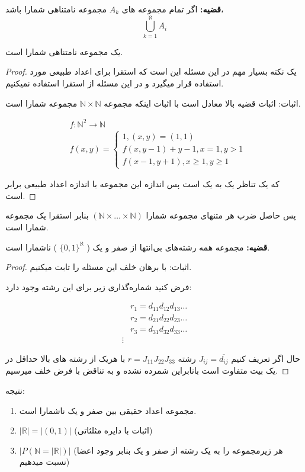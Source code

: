 \textbf{قضیه:}
اگر تمام مجموعه های
$A_k$
مجموعه نامتناهی شمارا باشد،
$$
\bigcup_{k= 1}^\aleph A_i
$$

یک مجموعه نامتناهی شمارا است.


\begin{proof}
    یک نکته بسیار مهم در این مسئله این است که استقرا برای اعداد طبیعی مورد استفاده قرار میگیرد و در این
    مسئله از استقرا استفاده نمیکنیم.    

    اثبات: اثبات قضیه بالا معادل است با اثبات اینکه مجموعه 
    $\mathbb{N}\times \mathbb{N}$
    مجموعه شمارا است.

    \begin{align*}
        &f: \mathbb{N}^2 \rightarrow \mathbb{N}\\
        &f(x, y) = 
        \begin{cases}
            1, (x, y) = (1,1)\\
            f(x, y-1) + y-1, x = 1, y > 1\\
            f(x-1, y+1), x \geq 1, y \geq 1
        \end{cases}
    \end{align*}

    که یک تناظر یک به یک است پس اندازه این مجموعه با اندازه اعداد طبیعی برابر است.
\end{proof}

پس حاصل ضرب هر متنهای مجموعه شمارا 
$(\mathbb{N} \times \dots \times \mathbb{N})$
بنابر استقرا یک مجموعه شمارا است.

\textbf{قضیه:}
مجموعه همه رشته‌های بی‌انتها از صفر و یک
(
    $\{0,1\}^\aleph$
)
ناشمارا است.

\begin{proof}
    اثبات:
    با برهان خلف این مسئله را ثابت میکنیم.

    فرض کنید شماره‌گذاری زیر برای این رشته وجود دارد:

    \begin{align*}
        &r_1 = d_{11}d_{12}d_{13}\dots\\
        &r_2 = d_{21}d_{22}d_{23}\dots\\
        &r_3 = d_{31}d_{32}d_{33}\dots\\
        \vdots
    \end{align*}

    حال اگر تعریف کنیم
    $J_{ij} = \overline{d_{ij}}$
    رشته 
    $r = J_{11}J_{22}J_{33}$
    با هریک از رشته های بالا حداقل در یک بیت متفاوت است بانابراین شمرده نشده و به تناقض با فرض خلف میرسیم.
\end{proof}

نتیجه:
\begin{enumerate}
    \item 
    مجموعه اعداد حقیقی بین صفر و یک ناشمارا است.
    \item
    $|\mathbb{R}| = |(0,1)|$
    (اثبات با دایره مثلثاتی)

    \item
    $|P(\mathbb{N} = |\mathbb{R}|)|$
    (هر زیرمجموعه را به یک رشته از صفر و یک بنابر وجود اعضا نسبت میدهیم)

\end{enumerate}
